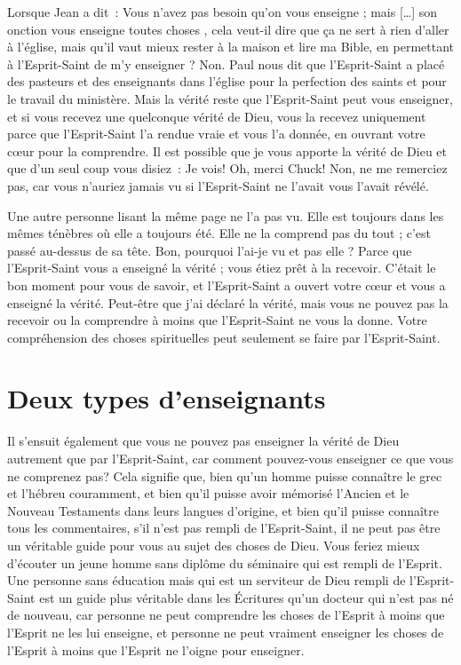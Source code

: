 Lorsque Jean a dit~:
 \og Vous n'avez pas besoin qu'on vous enseigne ;
 mais [\dots{}] son onction vous enseigne toutes choses \fg{},
 cela veut-il dire que ça ne sert à rien d'aller à l'église,
 mais qu'il vaut mieux rester à la maison et lire ma Bible,
 en permettant à l'Esprit-Saint de m'y enseigner ? Non.
 Paul nous dit que l'Esprit-Saint a placé des pasteurs
 et des enseignants dans l'église pour la perfection des saints
 et pour le travail du ministère.
 Mais la vérité reste que l'Esprit-Saint peut vous enseigner,
 et si vous recevez une quelconque vérité de Dieu,
 vous la recevez uniquement parce que l'Esprit-Saint
 l'a rendue vraie et vous l'a donnée, en ouvrant votre cœur
 pour la comprendre.
 Il est possible que je vous apporte la vérité de Dieu
 et que d'un seul coup vous disiez~: \og Je vois!
 Oh, merci Chuck! \fg{} Non, ne me remerciez pas,
 car vous n'auriez jamais vu si l'Esprit-Saint
 ne l'avait vous l'avait révélé.

Une autre personne lisant la même page ne l'a pas vu.
 Elle est toujours dans les mêmes ténèbres où elle a toujours été.
 Elle ne la comprend pas du tout ; c'est passé au-dessus de sa tête.
 \og Bon, pourquoi l'ai-je vu et pas elle ? \fg{}
 Parce que l'Esprit-Saint vous a enseigné la vérité ;
 vous étiez prêt à la recevoir.
 C'était le bon moment pour vous de savoir, et l'Esprit-Saint
 a ouvert votre cœur et vous a enseigné la vérité.
 Peut-être que j'ai déclaré la vérité, mais vous ne pouvez pas la recevoir
 ou la comprendre à moins que l'Esprit-Saint ne vous la donne.
 Votre compréhension des choses spirituelles peut seulement se faire
 par l'Esprit-Saint.


\section*{Deux types d'enseignants}

Il s'ensuit également que vous ne pouvez pas enseigner
 la vérité de Dieu autrement que par l'Esprit-Saint,
 car comment pouvez-vous enseigner ce que vous ne comprenez pas?
 Cela signifie que, bien qu'un homme puisse connaître le grec et l'hébreu
 couramment, et bien qu'il puisse avoir mémorisé l'Ancien
 et le Nouveau Testaments dans leurs langues d'origine,
 et bien qu'il puisse connaître tous les commentaires,
 s'il n'est pas rempli de l'Esprit-Saint,
 il ne peut pas être un véritable guide pour vous
 au sujet des choses de Dieu.
 Vous feriez mieux d'écouter un jeune homme sans diplôme
 du séminaire qui est rempli de l'Esprit.
 Une personne sans éducation mais qui est un serviteur de Dieu
 rempli de l'Esprit-Saint est un guide plus véritable
 dans les Écritures qu'un docteur qui n'est pas né de nouveau,
 car personne ne peut comprendre les choses de l'Esprit
 à moins que l'Esprit ne les lui enseigne,
 et personne ne peut vraiment enseigner les choses de l'Esprit
 à moins que l'Esprit ne l'oigne pour enseigner.

